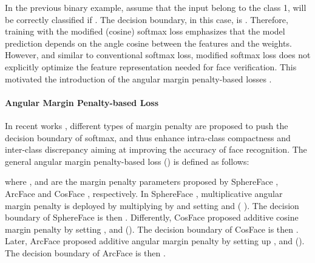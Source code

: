 \documentclass[letterpaper, 10 pt, conference]{ieeeconf}  \usepackage{times}
\begin{document}
In the previous binary example, assume that the input  belong to the class 1,  will be correctly classified if .
The decision boundary, in this case, is .
Therefore, training with the modified (cosine) softmax loss emphasizes that the model prediction depends on the angle cosine between the features and the weights. 
However, and similar to conventional softmax loss, modified softmax loss does not explicitly optimize the feature representation needed for face verification.
This motivated the introduction of the angular margin penalty-based losses \cite{deng2019arcface,DBLP:conf/cvpr/WangWZJGZL018,DBLP:conf/cvpr/LiuWYLRS17}.

\paragraph{Angular Margin Penalty-based Loss}
In recent works  \cite{deng2019arcface,DBLP:conf/cvpr/WangWZJGZL018,DBLP:conf/cvpr/LiuWYLRS17}, different types of margin penalty are proposed to push the decision boundary of softmax, and thus enhance intra-class compactness and inter-class discrepancy aiming at improving the accuracy of face recognition.
The general angular margin penalty-based loss () is defined as follows:



where ,  and  are the margin penalty parameters proposed by SphereFace \cite{DBLP:conf/cvpr/LiuWYLRS17}, ArcFace \cite{deng2019arcface} and CosFace \cite{DBLP:conf/cvpr/WangWZJGZL018}, respectively.
In SphereFace \cite{DBLP:conf/cvpr/LiuWYLRS17}, multiplicative angular margin penalty is deployed by multiplying  by  and setting  and  (  ). The decision boundary of SphereFace is then .
Differently, CosFace \cite{DBLP:conf/cvpr/WangWZJGZL018} proposed additive cosine margin penalty by setting ,  and  (). The decision boundary of CosFace is then .
Later, ArcFace \cite{deng2019arcface} proposed additive angular margin penalty by setting up ,  and  (). The decision boundary of ArcFace is then .
\end{document}
